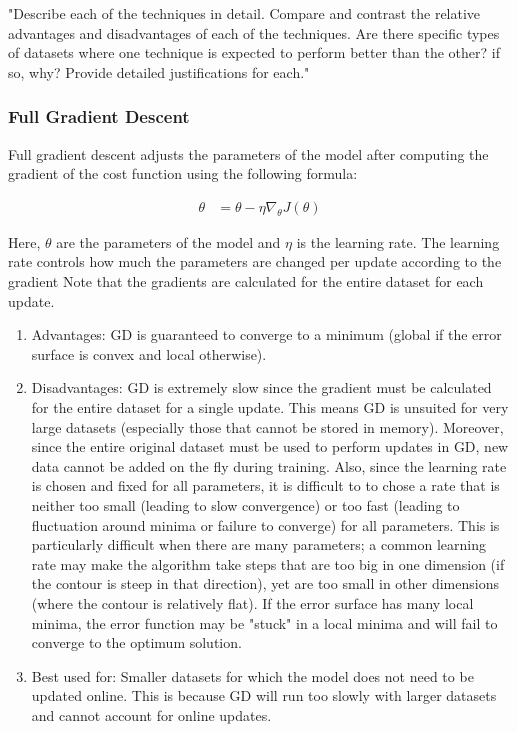 \documentclass[twoside,11pt]{homework}
\begin{document}
"Describe each of the techniques in detail. Compare and contrast the relative advantages and
disadvantages of each of the techniques. Are there specific types of datasets where one technique is expected to perform better than the other? if so, why? Provide detailed justifications
for each."
\subsubsection*{Full Gradient Descent}
Full gradient descent adjusts the parameters of the model after computing the gradient of the cost function using the following formula:

\begin{align*}
	\theta &= \theta - \eta \nabla_\theta J(\theta)
\end{align*}

Here, $\theta$ are the parameters of the model and $\eta$ is the learning rate. The learning rate controls how much the parameters are changed per update according to the gradient Note that the gradients are calculated for the entire dataset for each update.

\begin{enumerate}
	\item Advantages: GD is guaranteed to converge to a minimum (global if the error surface is convex and local otherwise).
	\item Disadvantages: GD is extremely slow since the gradient must be calculated for the entire dataset for a single update. This means GD is unsuited for very large datasets (especially those that cannot be stored in memory). Moreover, since the entire original dataset must be used to perform updates in GD, new data cannot be added on the fly during training. Also, since the learning rate is chosen and fixed for all parameters, it is difficult to to chose a rate that is neither too small (leading to slow convergence) or too fast (leading to fluctuation around minima or failure to converge) for all parameters. This is particularly difficult when there are many parameters; a common learning rate may make the algorithm take steps that are too big in one dimension (if the contour is steep in that direction), yet are too small in other dimensions (where the contour is relatively flat). If the error surface has many local minima, the error function may be "stuck" in a local minima and will fail to converge to the optimum solution. 
	\item Best used for: Smaller datasets for which the model does not need to be updated online. This is because GD will run too slowly with larger datasets and cannot account for online updates. 
\end{enumerate}
\end{document}

